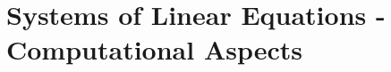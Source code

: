 

\vspace{12pt}



\vspace{12pt}



\vspace{12pt}

\setcounter{Exercise}{7}


\vspace{12pt}

\setcounter{Exercise}{9}



\section{Systems of Linear Equations - Computational Aspects}



\vspace{12pt}



\vspace{12pt}

\setcounter{Exercise}{11}
